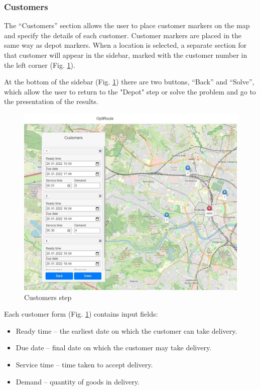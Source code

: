 \documentclass[a4paper,twoside,12pt]{book}
\begin{document}
\subsubsection{Customers}

The ``Customers'' section allows the user to place customer markers on the map and specify the details of each customer. Customer markers are placed in the same way as depot markers. When a location is selected, a separate section for that customer will appear in the sidebar, marked with the customer number in the left corner (Fig. \ref{fig:customers}). 



At the bottom of the sidebar (Fig. \ref{fig:customers}) there are two buttons, ``Back'' and ``Solve'', which allow the user to return to the "Depot" step or solve the problem and go to the presentation of the results.

\begin{figure}[htb]
\centering
\includegraphics[width=\textwidth]{images/customers_updated.jpg}
\caption{Customers step}
\label{fig:customers}
\end{figure}

Each customer form (Fig. \ref{fig:customers}) contains input fields:
\begin{itemize}
    \item Ready time -- the earliest date on which the customer can take delivery.
    \item Due date -- final date on which the customer may take delivery.
    \item Service time -- time taken to accept delivery.
    \item Demand -- quantity of goods in delivery.
\end{itemize}
\end{document}
